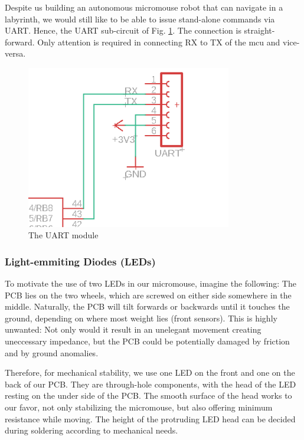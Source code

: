 Despite us building an autonomous micromouse robot that can navigate in a labyrinth, we would still like to be able to issue stand-alone commands via UART. Hence, the UART sub-circuit of Fig. \ref{fig:uart}. The connection is straight-forward. Only attention is required in connecting RX to TX of the mcu and vice-versa.

\begin{figure}[htb]
    \centering
    \includegraphics[width=0.8\textwidth]{figures/hardware/UART.PNG}
    \caption{The UART module}
    \label{fig:uart}
\end{figure}

\FloatBarrier
\vspace{1cm}


\subsubsection{Light-emmiting Diodes (LEDs)}

To motivate the use of two LEDs in our micromouse, imagine the following: The PCB lies on the two wheels, which are screwed on either side somewhere in the middle. Naturally, the PCB will tilt forwards or backwards until it touches the ground, depending on where most weight lies (front sensors). This is highly unwanted: Not only would it result in an unelegant movement creating uneccessary impedance, but the PCB could be potentially damaged by friction and by ground anomalies.

Therefore, for mechanical stability, we use one LED on the front and one on the back of our PCB. They are through-hole components, with the head of the LED resting on the under side of the PCB. The smooth surface of the head works to our favor, not only stabilizing the micromouse, but also offering minimum resistance while moving. The height of the protruding LED head can be decided during soldering according to mechanical needs.


